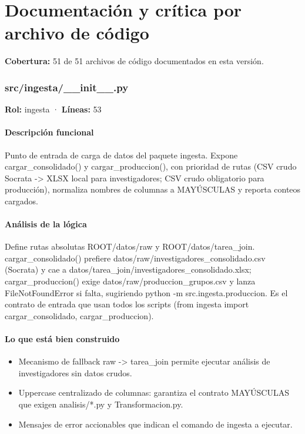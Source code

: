 \section{Documentación y crítica por archivo de código}
\noindent \textbf{Cobertura:} 51 de 51 archivos de código documentados en esta versión.

\subsubsection{src/ingesta/\_\_init\_\_.py}
\textbf{Rol:} ingesta · \textbf{Líneas:} 53

\paragraph{Descripción funcional}
Punto de entrada de carga de datos del paquete ingesta. Expone cargar\_consolidado() y cargar\_produccion(), con prioridad de rutas (CSV crudo Socrata -> XLSX local para investigadores; CSV crudo obligatorio para producción), normaliza nombres de columnas a MAYÚSCULAS y reporta conteos cargados.

\paragraph{Análisis de la lógica}
Define rutas absolutas ROOT/datos/raw y ROOT/datos/tarea\_join. cargar\_consolidado() prefiere datos/raw/investigadores\_consolidado.csv (Socrata) y cae a datos/tarea\_join/investigadores\_consolidado.xlsx; cargar\_produccion() exige datos/raw/produccion\_grupos.csv y lanza FileNotFoundError si falta, sugiriendo python -m src.ingesta.produccion. Es el contrato de entrada que usan todos los scripts (from ingesta import cargar\_consolidado, cargar\_produccion).

\paragraph{Lo que está bien construido}
\begin{itemize}
  \item Mecanismo de fallback raw -> tarea\_join permite ejecutar análisis de investigadores sin datos crudos.
  \item Uppercase centralizado de columnas: garantiza el contrato MAYÚSCULAS que exigen analisis/*.py y Transformacion.py.
  \item Mensajes de error accionables que indican el comando de ingesta a ejecutar.
\end{itemize}

